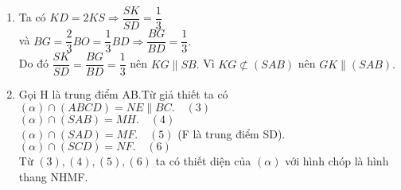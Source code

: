 \begin{bt}
{\begin{enumerate}
Vì $OM\cap ON =O$ nên từ $(1)$ và $(2)$ ta có $(OMN)\parallel (SBC) .$
\item Ta có $KD =2KS\Rightarrow \dfrac{SK}{SD}=\dfrac{1}{3}$ \\[0.3cm]
và $BG =\dfrac{2}{3}BO=\dfrac{1}{3}BD \Rightarrow \dfrac{BG}{BD}=\dfrac{1}{3}.$ \\[0.3cm]
Do đó $\dfrac{SK}{SD}= \dfrac{BG}{BD}=\dfrac{1}{3}$ nên $KG\parallel SB.$ Vì $KG \not\subset (SAB)$ nên $GK \parallel (SAB) .$
\item Gọi H là trung điểm AB.Từ giả thiết ta có\\
 $(\alpha )\cap (ABCD) =NE \parallel BC.\quad  (3)$ \\
$(\alpha )\cap (SAB) =MH.\quad (4)$\\
$(\alpha )\cap (SAD) = MF. \quad (5)$ (F là trung điểm SD).\\
$(\alpha )\cap (SCD) = NF. \quad (6)$\\
Từ $(3),(4),(5),(6)$ ta có thiết diện của $(\alpha )$ với hình chóp là hình thang NHMF.
\end{enumerate}
}
\end{bt}



